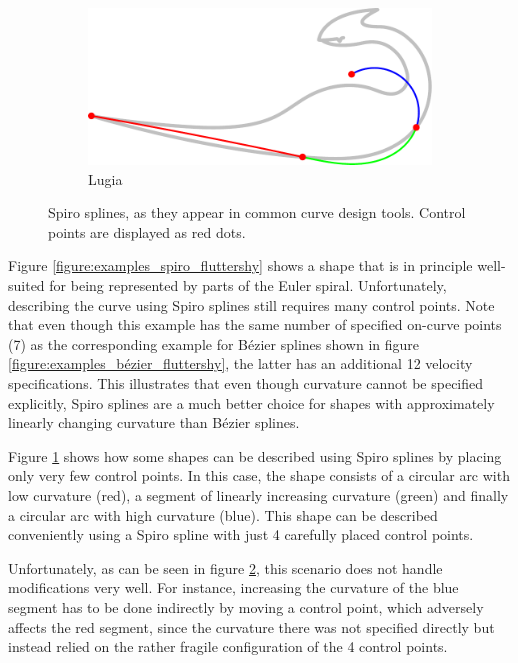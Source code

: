\documentclass[a4paper]{article}
\begin{document}
\begin{figure}[htb]
\begin{minipage}[b]{\textwidth / 2}
\begin{subfigure}[b]{\textwidth}
							\label{figure:examples_spiro_lugia_1}
						\end{subfigure}
						\begin{subfigure}[b]{\textwidth}
							\includegraphics[width=\textwidth]{content/output/examples_spiro_lugia_2.pdf}
							\caption{Lugia \cite{lugia}}
							\label{figure:examples_spiro_lugia_2}
						\end{subfigure}
					\end{minipage}
					\caption{Spiro splines, as they appear in common curve design tools. Control points are displayed as red dots.}
					\label{figure:examples_spiro}
				\end{figure}

				Figure \ref{figure:examples_spiro_fluttershy} shows a shape that is in principle well-suited for being represented by parts of the Euler spiral. Unfortunately, describing the curve using Spiro splines still requires many control points. Note that even though this example has the same number of specified on-curve points (7) as the corresponding example for Bézier splines shown in figure \ref{figure:examples_bézier_fluttershy}, the latter has an additional 12 velocity specifications. This illustrates that even though curvature cannot be specified explicitly, Spiro splines are a much better choice for shapes with approximately linearly changing curvature than Bézier splines.

				Figure \ref{figure:examples_spiro_lugia_1} shows how some shapes can be described using Spiro splines by placing only very few control points. In this case, the shape consists of a circular arc with low curvature (red), a segment of linearly increasing curvature (green) and finally a circular arc with high curvature (blue). This shape can be described conveniently using a Spiro spline with just 4 carefully placed control points.

				Unfortunately, as can be seen in figure \ref{figure:examples_spiro_lugia_2}, this scenario does not handle modifications very well. For instance, increasing the curvature of the blue segment has to be done indirectly by moving a control point, which adversely affects the red segment, since the curvature there was not specified directly but instead relied on the rather fragile configuration of the 4 control points.
\end{document}
